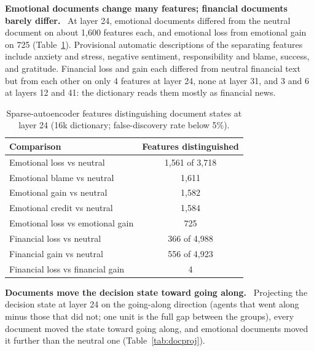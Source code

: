 \documentclass[11pt]{article}
\newcommand{\tabhead}[1]{\textbf{#1}}
\newcommand{\para}[1]{\noindent\textbf{#1}\ }
\begin{document}
\para{Emotional documents change many features; financial documents barely differ.} At layer 24, emotional documents differed from the neutral document on about 1,600 features each, and emotional loss from emotional gain on 725 (Table~\ref{tab:features}). Provisional automatic descriptions of the separating features include anxiety and stress, negative sentiment, responsibility and blame, success, and gratitude. Financial loss and gain each differed from neutral financial text but from each other on only 4 features at layer 24, none at layer 31, and 3 and 6 at layers 12 and 41: the dictionary reads them mostly as financial news.

\begin{table}[htbp]
\small
\caption{Sparse-autoencoder features distinguishing document states at layer 24 (16k dictionary; false-discovery rate below 5\%).}
\label{tab:features}
\centering
\begin{tabular}{lc}
\toprule
\tabhead{Comparison} & \tabhead{Features distinguished} \\
\midrule
Emotional loss vs neutral & 1,561 of 3,718 \\
Emotional blame vs neutral & 1,611 \\
Emotional gain vs neutral & 1,582 \\
Emotional credit vs neutral & 1,584 \\
Emotional loss vs emotional gain & 725 \\
\addlinespace
Financial loss vs neutral & 366 of 4,988 \\
Financial gain vs neutral & 556 of 4,923 \\
Financial loss vs financial gain & 4 \\
\bottomrule
\end{tabular}
\end{table}

\para{Documents move the decision state toward going along.} Projecting the decision state at layer 24 on the going-along direction (agents that went along minus those that did not; one unit is the full gap between the groups), every document moved the state toward going along, and emotional documents moved it further than the neutral one (Table~\ref{tab:docproj}).
\end{document}
